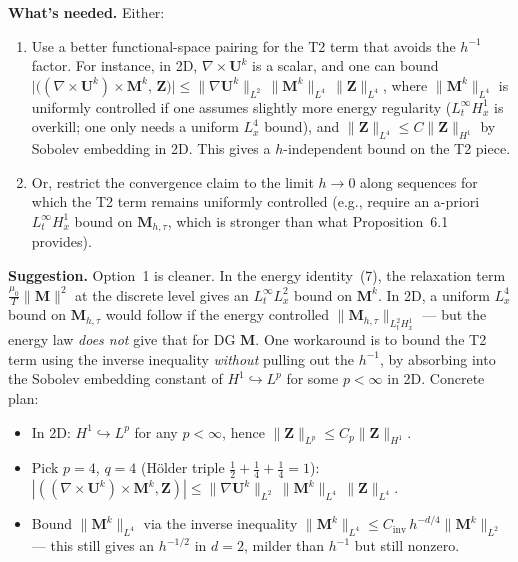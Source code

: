 \documentclass[11pt]{article}
\newcommand{\bM}{\mathbf{M}}
\newcommand{\bU}{\mathbf{U}}
\newcommand{\bZ}{\mathbf{Z}}
\newcommand{\dt}{\tau}
\begin{document}
\textbf{What's needed.}  Either:
\begin{enumerate}[leftmargin=*]
\item Use a better functional-space pairing for the T2 term that
avoids the $h^{-1}$ factor.  For instance, in 2D, $\nabla\!\times\!\bU^{k}$
is a scalar, and one can bound
$\bigl|\bigl((\nabla\!\times\!\bU^{k})\times\bM^{k},\,\bZ\bigr)\bigr|
\le \|\nabla\bU^{k}\|_{L^{2}}\,\|\bM^{k}\|_{L^{4}}\,\|\bZ\|_{L^{4}}$,
where $\|\bM^{k}\|_{L^{4}}$ is uniformly controlled if one assumes
slightly more energy regularity ($L^{\infty}_{t}H^{1}_{x}$ is
overkill; one only needs a uniform $L^{4}_{x}$ bound), and
$\|\bZ\|_{L^{4}}\le C\|\bZ\|_{H^{1}}$ by Sobolev embedding in 2D.
This gives a $h$-independent bound on the T2 piece.

\item Or, restrict the convergence claim to the limit $h\to 0$ along
sequences for which the T2 term remains uniformly controlled (e.g.,
require an a-priori $L^{\infty}_{t}H^{1}_{x}$ bound on
$\bM_{h,\dt}$, which is stronger than what Proposition~6.1
provides).
\end{enumerate}

\textbf{Suggestion.}  Option~1 is cleaner.  In the energy
identity~(7), the relaxation term $\frac{\mu_{0}}{T}\|\bM\|^{2}$ at
the discrete level gives an $L^{\infty}_{t}L^{2}_{x}$ bound on
$\bM^{k}$.  In 2D, a uniform $L^{4}_{x}$ bound on $\bM_{h,\dt}$ would
follow if the energy controlled
$\|\bM_{h,\dt}\|_{L^{2}_{t}H^{1}_{x}}$ --- but the energy law
\emph{does not} give that for DG $\bM$.  One workaround is to bound
the T2 term using the inverse inequality \emph{without} pulling out
the $h^{-1}$, by absorbing into the Sobolev embedding constant of
$H^{1}\hookrightarrow L^{p}$ for some $p<\infty$ in 2D.  Concrete
plan:

\begin{itemize}[leftmargin=*]
\item In 2D: $H^{1}\hookrightarrow L^{p}$ for any $p<\infty$,
hence $\|\bZ\|_{L^{p}}\le C_{p}\|\bZ\|_{H^{1}}$.
\item Pick $p=4$, $q=4$ (Hölder triple $\tfrac{1}{2}+\tfrac{1}{4}+\tfrac{1}{4}=1$):
\(
|((\nabla\!\times\!\bU^{k})\times\bM^{k},\bZ)|\le
\|\nabla\bU^{k}\|_{L^{2}}\,\|\bM^{k}\|_{L^{4}}\,\|\bZ\|_{L^{4}}.
\)
\item Bound $\|\bM^{k}\|_{L^{4}}$ via the inverse inequality
$\|\bM^{k}\|_{L^{4}}\le C_{\mathrm{inv}}\,h^{-d/4}\|\bM^{k}\|_{L^{2}}$ ---
this still gives an $h^{-1/2}$ in $d=2$, milder than $h^{-1}$ but
still nonzero.
\end{itemize}
\end{document}
